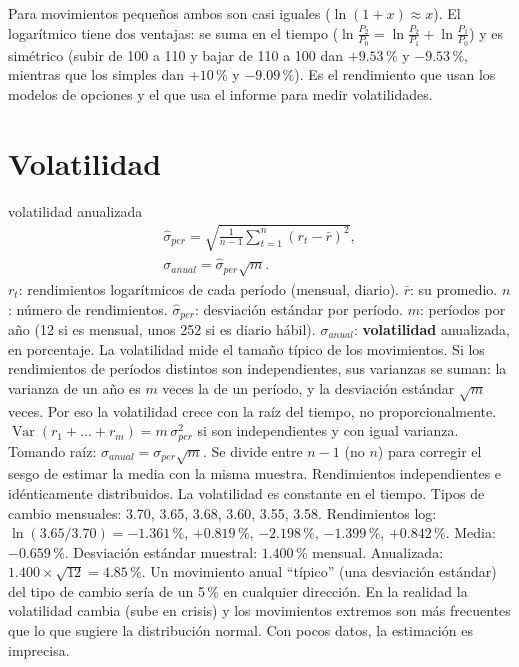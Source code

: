 Para movimientos pequeños ambos son casi iguales ($\ln(1+x)\approx x$). El logarítmico tiene dos ventajas: se suma en el tiempo ($\ln\frac{P_2}{P_0}=\ln\frac{P_2}{P_1}+\ln\frac{P_1}{P_0}$) y es simétrico (subir de 100 a 110 y bajar de 110 a 100 dan $+9.53\,\%$ y $-9.53\,\%$, mientras que los simples dan $+10\,\%$ y $-9.09\,\%$). Es el rendimiento que usan los modelos de opciones y el que usa el informe para medir volatilidades.

\section{Volatilidad}

\begin{ficha}{volatilidad anualizada}
\begin{gather*} \hat\sigma_{per}=\sqrt{\frac{1}{n-1}\sum_{t=1}^{n}(r_t-\bar r)^2},\\ \sigma_{anual}=\hat\sigma_{per}\sqrt{m}. \end{gather*}
 $r_t$: rendimientos logarítmicos de cada período (mensual, diario). $\bar r$: su promedio. $n$: número de rendimientos. $\hat\sigma_{per}$: desviación estándar por período. $m$: períodos por año (12 si es mensual, unos 252 si es diario hábil). $\sigma_{anual}$: \textbf{volatilidad} anualizada, en porcentaje.
 La volatilidad mide el tamaño típico de los movimientos. Si los rendimientos de períodos distintos son independientes, sus varianzas se suman: la varianza de un año es $m$ veces la de un período, y la desviación estándar $\sqrt{m}$ veces. Por eso la volatilidad crece con la raíz del tiempo, no proporcionalmente.
 $\operatorname{Var}(r_1+\dots+r_m)=m\,\sigma^2_{per}$ si son independientes y con igual varianza. Tomando raíz: $\sigma_{anual}=\sigma_{per}\sqrt m$. Se divide entre $n-1$ (no $n$) para corregir el sesgo de estimar la media con la misma muestra.
 Rendimientos independientes e idénticamente distribuidos. La volatilidad es constante en el tiempo.
 Tipos de cambio mensuales: 3.70, 3.65, 3.68, 3.60, 3.55, 3.58. Rendimientos log: $\ln(3.65/3.70)=-1.361\,\%$, $+0.819\,\%$, $-2.198\,\%$, $-1.399\,\%$, $+0.842\,\%$. Media: $-0.659\,\%$. Desviación estándar muestral: $1.400\,\%$ mensual. Anualizada: $1.400\times\sqrt{12}=4.85\,\%$.
 Un movimiento anual \enquote{típico} (una desviación estándar) del tipo de cambio sería de un 5\,\% en cualquier dirección.
 En la realidad la volatilidad cambia (sube en crisis) y los movimientos extremos son más frecuentes que lo que sugiere la distribución normal. Con pocos datos, la estimación es imprecisa.
\end{ficha}

